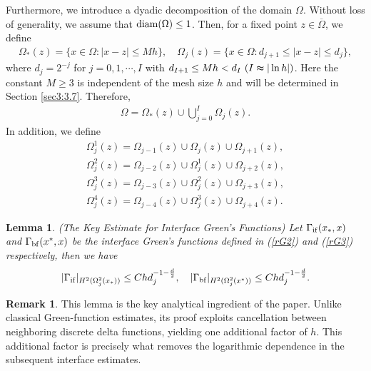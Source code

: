\documentclass[1996/10/24]{amsart}
\newtheorem{lemma}[theorem]{Lemma}
\theoremstyle{definition}
\newtheorem{remark}[theorem]{Remark}
\numberwithin{equation}{section}
\begin{document}
Furthermore, we introduce a dyadic decomposition of the domain $\Omega$. Without loss of generality, we assume
that ${\rm diam}(\Omega)\leq 1$. Then, for a fixed point $z\in \overline{\Omega}$, we define
\begin{align*}
\Omega_{\ast}(z)=\{x\in\Omega: |x-z|\leq Mh\},\quad \Omega_j(z)=\{x\in\Omega: d_{j+1}\leq|x-z|\leq d_j\},
\end{align*}
where $d_j=2^{-j}$ for $j=0,1,\cdots,I$ with $d_{I+1}\leq Mh<d_I~(I\thickapprox|\ln h|)$. Here the constant
$M \geq 3$ is independent of the mesh size $h$ and will be determined in Section \ref{sec3:3.7}. Therefore,
\begin{align*}
\Omega=\Omega_{\ast}(z)\cup\bigcup_{j=0}^I\Omega_j(z).
\end{align*}
In addition, we define
\begin{align*}
\Omega_j^1(z)=\Omega_{j-1}(z)\cup\Omega_j(z)\cup\Omega_{j+1}(z),\\
\Omega_j^2(z)=\Omega_{j-2}(z)\cup\Omega_j^1(z)\cup\Omega_{j+2}(z),\\
\Omega_j^3(z)=\Omega_{j-3}(z)\cup\Omega_j^2(z)\cup\Omega_{j+3}(z),\\
\Omega_j^4(z)=\Omega_{j-4}(z)\cup\Omega_j^3(z)\cup\Omega_{j+4}(z).
\end{align*}

\begin{lemma} (The Key Estimate for Interface Green's Functions)
\label{ee-rG23}
Let $\Gamma_{{\rm if}}(x_{\ast},x)$ and $\Gamma_{{\rm bf}}(x^{\ast},x)$ be the interface Green's functions defined
in (\ref{rG2}) and (\ref{rG3}) respectively, then we have
\begin{align}
|\Gamma_{{\rm if}}|_{H^2(\Omega_j^2(x_{\ast}))}\leq Chd_j^{-1-\frac{d}{2}},\quad |\Gamma_{{\rm bf}}|_{H^2(\Omega_j^2(x^{\ast}))}\leq Chd_j^{-1-\frac{d}{2}}.\label{ee-rG23:1}
\end{align}
\end{lemma}

\begin{remark}
\label{remark_key_lemma}
This lemma is the key analytical ingredient of the paper. Unlike classical Green-function estimates, its proof exploits cancellation between neighboring discrete delta functions, yielding one additional factor of \(h\).
This additional factor is precisely what removes the logarithmic dependence in the subsequent interface estimates.
\end{remark}
\end{document}
